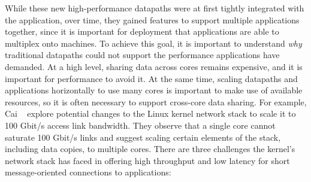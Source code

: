 While these new high-performance datapaths were at first tightly integrated with the application, over time, they gained features to support multiple applications together, since it is important for deployment that applications are able to multiplex onto machines. 
To achieve this goal, it is important to understand \emph{why} traditional datapaths could not support the performance applications have demanded. 
At a high level, sharing data across cores remains expensive, and it is important for performance to avoid it. At the same time, scaling datapaths and applications horizontally to use many cores is important to make use of available resources, so it is often necessary to support cross-core data sharing.
For example, Cai \etal~\cite{host-net-overheads} explore potential changes to the Linux kernel network stack to scale it to 100 Gbit/s access link bandwidth. They observe that a single core cannot saturate 100 Gbit/s links and suggest scaling certain elements of the stack, including data copies, to multiple cores.
There are three challenges the kernel's network stack has faced in offering high throughput and low latency for short message-oriented connections to applications:
